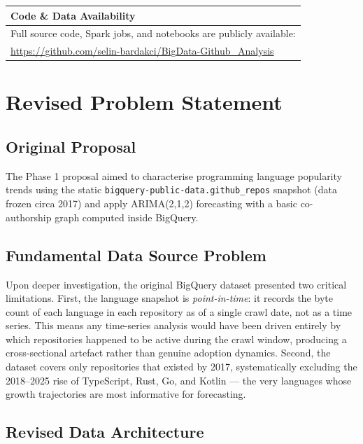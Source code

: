 \documentclass[conference]{IEEEtran}
\begin{document}
\begin{table}[htbp]
\centering\small
\begin{tabular}{p{}}
\hline
\textbf{Code \& Data Availability}\\
\hline
\vspace{1pt}
Full source code, Spark jobs, and notebooks are publicly available:\\[3pt]
\url{https://github.com/selin-bardakci/BigData-Github_Analysis}
\vspace{3pt}\\
\hline
\end{tabular}
\end{table}

\section{Revised Problem Statement}

\subsection{Original Proposal}

The Phase 1 proposal aimed to characterise programming language popularity
trends using the static \texttt{bigquery-public-data.github\_repos} snapshot
(data frozen circa 2017) and apply ARIMA(2,1,2) forecasting with a basic
co-authorship graph computed inside BigQuery.

\subsection{Fundamental Data Source Problem}

Upon deeper investigation, the original BigQuery dataset presented two
critical limitations. First, the language snapshot is \emph{point-in-time}:
it records the byte count of each language in each repository as of a single
crawl date, not as a time series. This means any time-series analysis would
have been driven entirely by which repositories happened to be active during
the crawl window, producing a cross-sectional artefact rather than genuine
adoption dynamics. Second, the dataset covers only repositories that existed
by 2017, systematically excluding the 2018--2025 rise of TypeScript, Rust,
Go, and Kotlin — the very languages whose growth trajectories are most
informative for forecasting.

\subsection{Revised Data Architecture}
\end{document}
